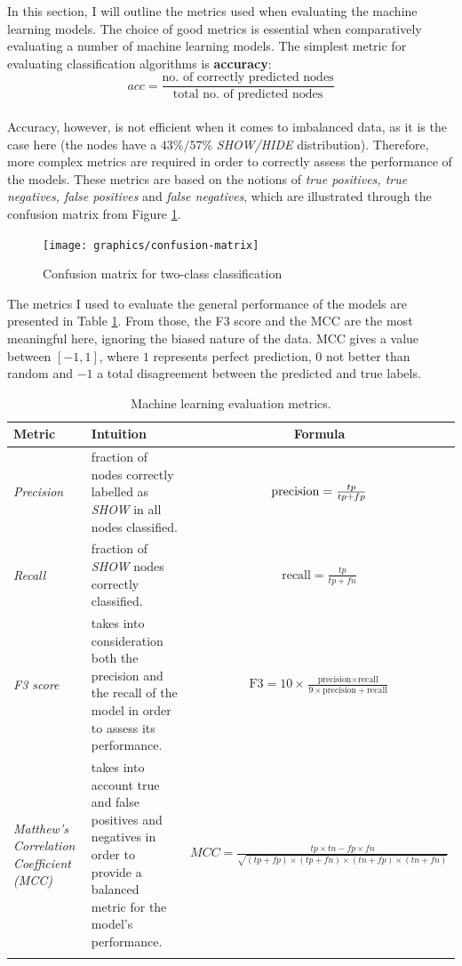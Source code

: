 		In this section, I will outline the metrics used when evaluating the machine learning models. The choice of good metrics is essential when comparatively evaluating a number of machine learning models. The simplest metric for evaluating classification algorithms is \textbf{accuracy}: 
		\\
		\begin{equation}
			acc = \frac{\text{no. of correctly predicted nodes}}{\text{total no. of predicted nodes}}
		\end{equation}
		\\
		Accuracy, however, is not efficient when it comes to imbalanced data, as it is the case here (the nodes have a $43\%/57\%$ \textit{SHOW/HIDE} distribution). Therefore, more complex metrics are required in order to correctly assess the performance of the models. These metrics are based on the notions of \textit{true positives, true negatives, false positives} and \textit{false negatives}, which are illustrated through the confusion matrix from Figure \ref{Fig: eval/ml/metrics/confusion-matrix}.
		\begin{figure}[H]
			\centering
			\texttt{[image: graphics/confusion-matrix]}
			\caption{Confusion matrix for two-class classification}
			\label{Fig: eval/ml/metrics/confusion-matrix}
		\end{figure}
		The metrics I used to evaluate the general performance of the models are presented in Table \ref{Table: eval/ml/metrics/metrics}. From those, the F3 score and the MCC are the most meaningful here, ignoring the biased nature of the data. MCC gives a value between $[-1, 1]$, where $1$ represents perfect prediction, $0$ not better than random and $-1$ a total disagreement between the predicted and true labels.
		\begin{longtable}{|p{}|p{}|c|}
		   \textbf{Metric} & \textbf{Intuition} &\textbf{Formula} \\
			\hline
			\textit{Precision} & fraction of nodes correctly labelled as \textit{SHOW} in all nodes classified. & {$\centering \text{precision} = \frac{tp}{tp+fp}$} \\
			\hline 
			\textit{Recall} & fraction of \textit{SHOW} nodes correctly classified. & $\text{recall} = \frac{tp}{tp+fn}$ \\
			\hline
			\textit{F3 score} & takes into consideration both the precision and the recall of the model in order to assess its performance. & $\text{F3} = 10\times\frac{\text{precision}\times\text{recall}}{9\times\text{precision} + \text{recall}}$\\
			\hline 
			\textit{Matthew's Correlation Coefficient (MCC)} & takes into account true and false positives and negatives in order to provide a balanced metric for the model's performance. & $MCC = \frac{tp\times tn - fp\times fn}{\sqrt{(tp+fp)\times(tp+fn)\times(tn+fp)\times(tn+fn)}}$\\
			\hline
			\caption{Machine learning evaluation metrics.}
			\label{Table: eval/ml/metrics/metrics}
		\end{longtable}
		
